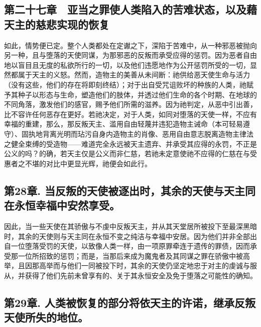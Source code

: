 
\subsection{第二十七章　亚当之罪使人类陷入的苦难状态，以及藉天主的慈悲实现的恢复}

如此，情势便已定。整个人类都处在定谳之下，深陷于苦难中，从一种邪恶被抛向另一种，且与堕落的天使同谋，为那邪恶的反叛而承受应得的惩罚。因为恶者自由地以盲目且无度的私欲所行的一切，以及他们违愿地作为公开惩罚所受的一切，显然都属于天主的义怒。然而，造物主的美善从未间断：祂供给恶天使生命与活力（没有这些，他们的存在将即刻终结）；对于出自受咒诅败坏的种族的人类，祂赋予其种子以形态与生命，塑造他们的肢体，并透过他们生命的各个时期、在地球的不同角落，激发他们的感官，赐予他们所需的滋养。因为祂判定，从恶中引出善，比不容许任何恶存在更好。若祂决定，对于人类，如同对堕落的天使一样，不应有幸福的重建，那么，那反叛天主、滥用自由轻蔑并违犯造物主诫命（本可轻易遵守）、固执地背离光明而玷污自身内造物主的肖像、恶用自由意志脱离造物主律法之健全束缚的受造物——难道完全永远被天主遗弃、并承受其应得的永罚，不正是公义的吗？的确，若天主仅是公义而非仁慈，若祂未定意使祂不应得的仁慈在与受惠者之不堪的对比中更显光辉，祂便会如此行。\par


\subsection{第28章. 当反叛的天使被逐出时，其余的天使与天主同在永恒幸福中安然享受。}

因此，当一些天使在其骄傲与不虔中反叛天主，并从其天堂居所被投下至最深黑暗时，其余的天使则与天主同在永恒不变之纯洁与幸福中安居。因为他们并非全部出自一位堕落受罚的天使，以致像人类一样，由一项原罪牵连于遗传的罪债，因而承受那一位所招致的惩罚；而是，当那后来成为魔鬼者及其同谋之罪在骄傲中被高举，且因那高举而与他们一同被投下时，其余的天使仍坚定地忠于对主的虔诚与服从，并获得了他们先前未曾享有的、关于其永恒安全及免于堕落之可能性的确知。\par


\subsection{第29章. 人类被恢复的部分将依天主的许诺，继承反叛天使所失的地位。}

